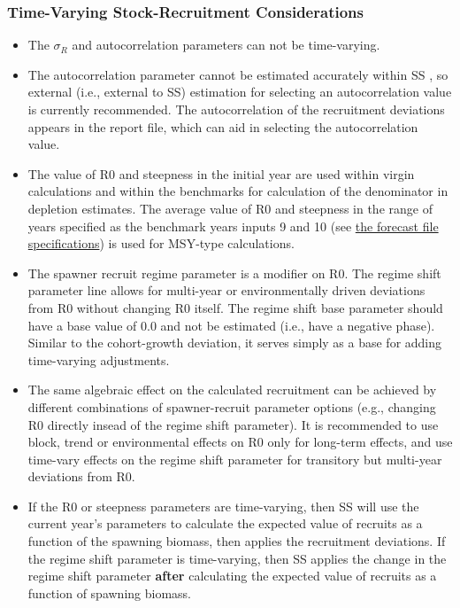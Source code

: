 \hypertarget{tv-sr}{}
\subsubsection{Time-Varying Stock-Recruitment Considerations}
\begin{itemize}
	
	\item The $\sigma_R$ and autocorrelation parameters can not be time-varying. 
	
	\item The autocorrelation parameter cannot be estimated accurately within SS \citep{johnson_can_2016}, so external (i.e., external to SS) estimation for selecting an autocorrelation value is currently recommended. The autocorrelation of the recruitment deviations appears in the report file, which can aid in selecting the autocorrelation value.
		
	\item The value of R0 and steepness in the initial year are used within virgin calculations and within the benchmarks for calculation of the denominator in depletion estimates. The average value of R0 and steepness in the range of years specified as the benchmark years inputs 9 and 10 (see \hyperlink{fore-specify}{the forecast file specifications}) is used for MSY-type calculations. 
	
	\item The spawner recruit regime parameter is a modifier on R0. The regime shift parameter line allows for multi-year or environmentally driven deviations from R0 without changing R0 itself. The regime shift base parameter should have a base value of 0.0 and not be estimated (i.e., have a negative phase). Similar to the cohort-growth deviation, it serves simply as a base for adding time-varying adjustments.
	
	\item The same algebraic effect on the calculated recruitment can be achieved by different combinations of spawner-recruit parameter options (e.g., changing R0 directly insead of the regime shift parameter). It is recommended to use block, trend or environmental effects on R0 only for long-term effects, and use time-vary effects on the regime shift parameter for transitory but multi-year deviations from R0.	
	
	\item If the R0 or steepness parameters are time-varying, then SS will use the current year's parameters to calculate the expected value of recruits as a function of the spawning biomass, then applies the recruitment deviations. If the regime shift parameter is time-varying, then SS applies the change in the regime shift parameter \textbf{after} calculating the expected value of recruits as a function of spawning biomass.

\end{itemize}

